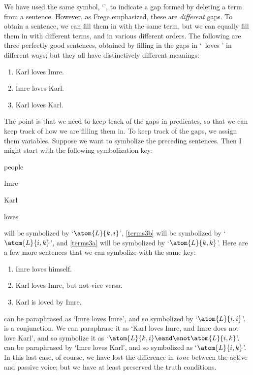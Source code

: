 We have used the same symbol, `\blank', to indicate a gap formed by deleting a term from a sentence. However, as \foreignlanguage{german}{Frege} emphasized, these are \emph{different} gaps. To obtain a sentence, we can fill them in with the same term, but we can equally fill them in with different terms, and in various different orders. The following are three perfectly good sentences, obtained by filling in the gaps in `\blank\ loves \blank{}' in different ways; but they all have distinctively different meanings:
\begin{enumerate}
	\item\label{terms3} Karl loves Imre.
	\item\label{terms3b} Imre loves Karl.
	\item\label{terms3a} Karl loves Karl.
\end{enumerate}
The point is that we need to keep track of the gaps in predicates, so that we can keep track of how we are filling them in. To keep track of the gaps, we assign them variables. Suppose we want to symbolize the preceding sentences. Then I might start with the following symbolization key: 
	\begin{ekey}
		\item[\text{domain}] people
		\item[i] Imre
		\item[k] Karl
		\item[\atom{L}{x,y}]  loves 
	\end{ekey}
  will be symbolized by `$\atom{L}{k,i}$', \cref*{terms3b} will be symbolized by `$\atom{L}{i,k}$', and \cref*{terms3a} will be symbolized by `$\atom{L}{k,k}$'. Here are a few more sentences that we can symbolize with the same key:
\begin{enumerate}
	\item\label{terms4} Imre loves himself.
	\item\label{terms5} Karl loves Imre, but not vice versa.
	\item\label{terms6} Karl is loved by Imre.
\end{enumerate}
 can be paraphrased as `Imre loves Imre', and so
symbolized by `$\atom{L}{i,i}$'.  is a conjunction. We
can paraphrase it as `Karl loves Imre, and Imre does not love Karl',
and so symbolize it as `$\atom{L}{k,i} \eand \enot \atom{L}{i,k}$'.
 can be paraphrased by `Imre loves Karl', and so
symbolized as `$\atom{L}{i,k}$'. In this last case, of course, we have
lost the difference in \emph{tone} between the active and passive
voice; but we have at least preserved the truth conditions.

